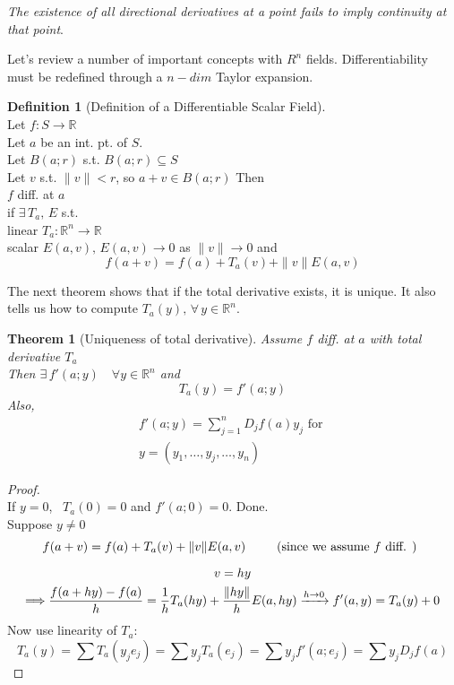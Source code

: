 \documentclass[twoside]{amsart}
\theoremstyle{plain}
\newtheorem{theorem}{Theorem}
\theoremstyle{definition}
\newtheorem{definition}{Definition}
\begin{document}
\emph{The existence of all directional derivatives at a point fails to imply continuity at that point}.

Let's review a number of important concepts with $R^n$ fields.  Differentiability must be redefined through a $n-dim$ Taylor expansion.    

\begin{definition}[Definition of a Differentiable Scalar Field] \quad \\
Let $f:S \to \mathbb{R}$ \\
Let $a$ be an int. pt. of $S$.  \\
Let $B(a;r)$ s.t. $B(a;r) \subseteq S$ \\
Let $v$ s.t. $\| v \| < r$, so $a+v \in B(a;r)$  Then \medskip \\
$f$ diff. at $a$ \\
\phantom{ f diff} if $\exists \, T_a, \, E$ s.t. \\
\phantom{ f diff if } linear $T_a:\mathbb{R}^n \to \mathbb{R}$ \\
\phantom{ f diff if } scalar $E(a,v), \, E(a,v) \to 0$ as $\| v \| \to 0$  and 
\begin{equation}
  f(a+v) = f(a) + T_a(v) + \| v\| E(a,v)
\end{equation}
\end{definition}

The next theorem shows that if the total derivative exists, it is unique.  It also tells us how to compute $T_a(y), \, \forall \, y \in \mathbb{R}^n$.  

\begin{theorem}[Uniqueness of total derivative]
Assume $f$ diff. at $a$ with total derivative $T_a$ \\
\phantom{Assu} Then $\exists \, f'(a;y) \quad \forall y \in \mathbb{R}^n$ and 
\[
T_a(y) = f'(a;y)
\]
Also, 
\[
\begin{gathered}
  f'(a;y) = \sum_{j=1}^{n} D_j f(a) y_j \text{ for } \\
  y = (y_1 , \dots , y_j , \dots , y_n) 
\end{gathered}
\]
\end{theorem}

\begin{proof} \quad \\
  If $y=0$, \quad \, $T_a(0) = 0$ and $f'(a;0)=0$.  Done.  \bigskip \\
  Suppose $y\neq 0$ \\
  \[
\begin{gathered}
  f(a+v) = f(a) +T_a(v) + \| v \| E(a,v) \quad \quad \, \text{ (since we assume $f$ diff. ) } \medskip \\
  v = hy \\
\Longrightarrow \frac{ f(a+hy) - f(a) }{ h } = \frac{1}{h} T_a(hy) + \frac{ \| hy \| }{ h } E(a,hy) \xrightarrow{ h\to 0 } f'(a,y)  = T_a(y)  + 0 \\
\end{gathered}
\]
Now use linearity of $T_a$: 
\[ T_a(y) = \sum T_a (y_j e_j) = \sum y_j T_a(e_j) = \sum y_j f'(a;e_j) = \sum y_j D_j f(a) \]
\end{proof}
\end{document}
